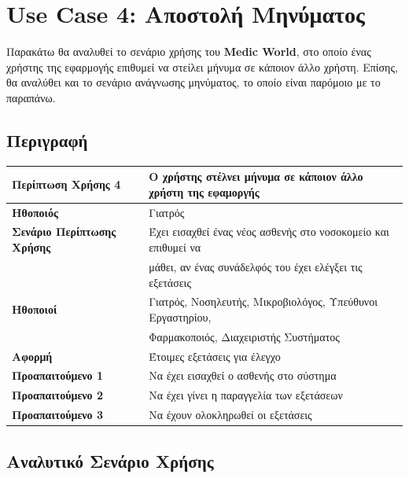 \documentclass{article}
\newcommand\T{\rule{0pt}{2.6ex}}       %
\newcommand\B{\rule[-1.2ex]{0pt}{0pt}}
\begin{document}
\newpage

\section{Use Case 4: Αποστολή Μηνύματος}

Παρακάτω θα αναλυθεί το σενάριο χρήσης του \textbf{Medic World}, στο οποίο ένας χρήστης της εφαρμογής επιθυμεί να στείλει μήνυμα σε κάποιον άλλο χρήστη. Επίσης, θα αναλύθει και το σενάριο ανάγνωσης μηνύματος, το οποίο είναι παρόμοιο με το παραπάνω.

\subsection{Περιγραφή}

\begin{center}
     \begin{tabular}{|l|l|}
     \hline
      \textbf{Περίπτωση Χρήσης 4} & Ο χρήστης στέλνει μήνυμα σε κάποιον άλλο χρήστη της εφαμοργής \T\B \\ 
      \hline
      \textbf{Ηθοποιός} & Γιατρός \T\B \\
      \hline
      \textbf{Σενάριο Περίπτωσης Χρήσης} & Έχει εισαχθεί ένας νέος ασθενής στο νοσοκομείο και επιθυμεί να \T \\& μάθει, αν ένας συνάδελφός του έχει ελέγξει τις εξετάσεις \B \\
      \hline
      \textbf{Ηθοποιοί} & Γιατρός, Νοσηλευτής, Μικροβιολόγος, Υπεύθυνοι Εργαστηρίου, \T \\& Φαρμακοποιός, Διαχειριστής Συστήματος \T\B \\
      \hline
      \textbf{Αφορμή} & Έτοιμες εξετάσεις για έλεγχο \T\B \\
      \hline
      \textbf{Προαπαιτούμενο 1} & Να έχει εισαχθεί ο ασθενής στο σύστημα \T\B \\
      \hline
      \textbf{Προαπαιτούμενο 2} & Να έχει γίνει η παραγγελία των εξετάσεων \T\B \\
      \hline
      \textbf{Προαπαιτούμενο 3} & Να έχουν ολοκληρωθεί οι εξετάσεις \T\B \\
      \hline
     \end{tabular}
 \end{center}
 
 \subsection{Αναλυτικό Σενάριο Χρήσης}
\end{document}
